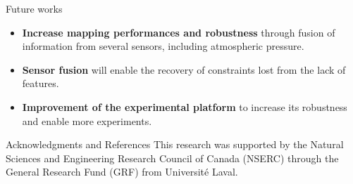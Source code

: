 \documentclass[final,hyperref={pdfpagelabels=false}]{beamer}
\begin{document}
\begin{frame}[t]
\begin{columns}[t]
\begin{column}{.465\textwidth}
\begin{block}{Future works}
	\begin{itemize}
		\item \textbf{Increase mapping performances and robustness} through fusion of information from several sensors, including atmospheric pressure.
		\item \textbf{Sensor fusion} will enable the recovery of constraints lost from the lack of features.
		\item \textbf{Improvement of the experimental platform} to increase its robustness and enable more experiments.
	\end{itemize}
\end{block}


\begin{block}{Acknowledgments and References}
\footnotesize%
\noindent This research was supported by the Natural Sciences and Engineering Research Council of Canada (NSERC) through the General Research Fund (GRF) from Université Laval.
\nocite{*} %
%
{\footnotesize}
\vspace{-3mm}
\end{block}

%
%
%
%


\end{column} %


\end{columns}
\end{frame}
\end{document}

